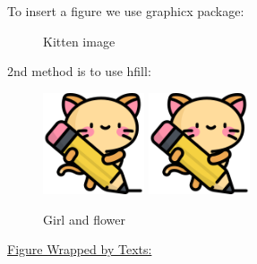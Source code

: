 \documentclass[12pt]{article}
\begin{document}
To insert a figure we use graphicx package: \\

\begin{figure}[!hbt]
    \centering
    \caption{Kitten image}

\end{figure}

2nd method is to use hfill:
\begin{figure}[!hbt]
    \centering
    \includegraphics[width=3.0cm]{kitty.png}\hfill
    \includegraphics[width=3.0cm]{kitty.png}
    \caption{Girl and flower}
\end{figure}











\begin{flushright}
    \underline{Figure Wrapped by Texts:} \\
\end{flushright} 
\end{document}
